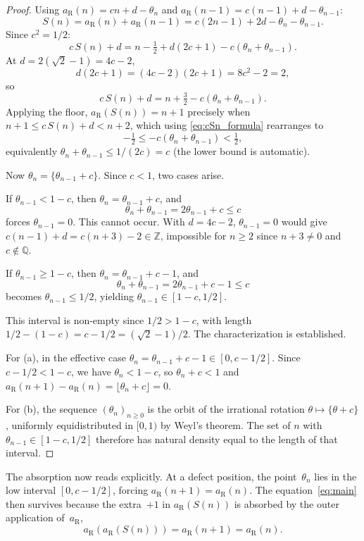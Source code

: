 \documentclass{birkjour}
\theoremstyle{definition}
\theoremstyle{remark}
\newcommand{\fl}[1]{\lfloor #1 \rfloor}
\newcommand{\frc}[1]{\{ #1 \}}
\begin{document}
\begin{proof}
Using $a_{\mathrm{R}}(n)=cn+d-\theta_{n}$ and
$a_{\mathrm{R}}(n{-}1)=c(n{-}1)+d-\theta_{n-1}$:
\[
  S(n)=a_{\mathrm{R}}(n)+a_{\mathrm{R}}(n{-}1)
  =c(2n{-}1)+2d-\theta_{n}-\theta_{n-1}.
\]
Since $c^{2}=1/2$:
\[
  c\,S(n)+d=n-\tfrac{1}{2}+d(2c{+}1)
  -c(\theta_{n}+\theta_{n-1}).
\]
At $d=2(\sqrt{2}{-}1)=4c-2$,
\[
  d(2c{+}1)=(4c-2)(2c{+}1)
  =8c^{2}-2=2,
\]
so
\begin{equation}\label{eq:cSn_formula}
  c\,S(n)+d=n+\tfrac{3}{2}-c(\theta_{n}+\theta_{n-1}).
\end{equation}
Applying the floor, $a_{\mathrm{R}}(S(n))=n+1$
precisely when $n{+}1\le c\,S(n)+d<n+2$, which using
\eqref{eq:cSn_formula} rearranges to
\[
  -\tfrac{1}{2}\le -c(\theta_{n}+\theta_{n-1})
  <\tfrac{1}{2},
\]
equivalently $\theta_{n}+\theta_{n-1}\le 1/(2c)=c$
(the lower bound is automatic).

Now $\theta_{n}=\frc{\theta_{n-1}+c}$. Since $c<1$, two
cases arise.

If $\theta_{n-1}<1-c$,
then $\theta_{n}=\theta_{n-1}+c$, and
\[
  \theta_{n}+\theta_{n-1}=2\theta_{n-1}+c\le c
\]
forces $\theta_{n-1}=0$. This cannot occur. With $d=4c-2$,
$\theta_{n-1}=0$ would give $c(n-1)+d=c(n+3)-2\in\mathbb{Z}$,
impossible for $n\ge 2$ since $n+3\ne 0$ and $c\notin\mathbb{Q}$.

If $\theta_{n-1}\ge 1-c$,
then $\theta_{n}=\theta_{n-1}+c-1$, and
\[
  \theta_{n}+\theta_{n-1}=2\theta_{n-1}+c-1\le c
\]
becomes $\theta_{n-1}\le 1/2$, yielding
$\theta_{n-1}\in[1-c,1/2]$.

This interval is non-empty since $1/2>1-c$, with
length $1/2-(1-c)=c-1/2=(\sqrt{2}{-}1)/2$. The
characterization is established.

For \textup{(a)}, in the effective case
$\theta_{n}=\theta_{n-1}+c-1\in[0,c-1/2]$.
Since $c-1/2<1-c$, we have $\theta_{n}<1-c$, so
$\theta_{n}+c<1$ and
$a_{\mathrm{R}}(n{+}1)-a_{\mathrm{R}}(n)
=\fl{\theta_{n}+c}=0$.

For \textup{(b)}, the sequence
$(\theta_{n})_{n\ge 0}$ is the orbit of the
irrational rotation $\theta\mapsto\frc{\theta+c}$,
uniformly equidistributed in $[0,1)$ by Weyl's
theorem. The set of $n$ with
$\theta_{n-1}\in[1-c,1/2]$ therefore has natural
density equal to the length of that interval.
\end{proof}

The absorption now reads explicitly. At a
defect position, the point~$\theta_{n}$
lies in the low interval $[0,c-1/2]$, forcing
$a_{\mathrm{R}}(n{+}1)=a_{\mathrm{R}}(n)$. The
equation~\eqref{eq:main} then survives because the
extra~$+1$ in $a_{\mathrm{R}}(S(n))$ is absorbed by
the outer application of~$a_{\mathrm{R}}$,
\[
  a_{\mathrm{R}}(a_{\mathrm{R}}(S(n)))
  =a_{\mathrm{R}}(n{+}1)=a_{\mathrm{R}}(n).
\]
\end{document}
